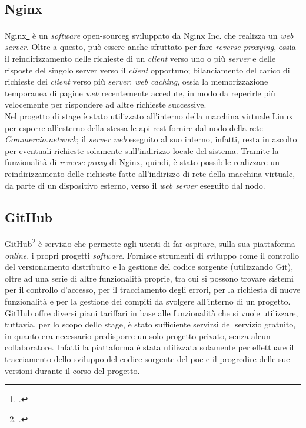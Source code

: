 \subsection{Nginx}

Nginx\footcite{site:nginx} è un \textit{software} \gls{open-sourceg} sviluppato da Nginx Inc. che realizza un \textit{web server}. Oltre a questo, può essere anche sfruttato per fare \textit{reverse proxying}, ossia il reindirizzamento delle richieste di un \textit{client} verso uno o più \textit{server} e delle risposte del singolo server verso il \textit{client} opportuno; bilanciamento del carico di richieste dei \textit{client} verso più \textit{server}; \textit{web caching}, ossia la memorizzazione temporanea di pagine \textit{web} recentemente accedute, in modo da reperirle più velocemente per rispondere ad altre richieste successive.\\
Nel progetto di stage è stato utilizzato all'interno della macchina virtuale Linux per esporre all'esterno della stessa le \gls{api} \gls{rest} fornire dal nodo della rete \textit{Commercio.network}; il \textit{server web} eseguito al suo interno, infatti, resta in ascolto per eventuali richieste solamente sull'indirizzo locale del sistema. Tramite la funzionalità di \textit{reverse proxy} di Nginx, quindi, è stato possibile realizzare un reindirizzamento delle richieste fatte all'indirizzo di rete della macchina virtuale, da parte di un dispositivo esterno, verso il \textit{web server} eseguito dal nodo.

\subsection{GitHub}

GitHub\footcite{site:github} è servizio che permette agli utenti di far ospitare, sulla sua piattaforma \textit{online}, i propri progetti \textit{software}. Fornisce strumenti di sviluppo come il controllo del versionamento distribuito e la gestione del codice sorgente (utilizzando Git), oltre ad una serie di altre funzionalità proprie, tra cui si possono trovare sistemi per il controllo d'accesso, per il tracciamento degli errori, per la richiesta di nuove funzionalità e per la gestione dei compiti da svolgere all'interno di un progetto.\\
GitHub offre diversi piani tariffari in base alle funzionalità che si vuole utilizzare, tuttavia, per lo scopo dello stage, è stato sufficiente servirsi del servizio gratuito, in quanto era necessario predisporre un solo progetto privato, senza alcun collaboratore. Infatti la piattaforma è stata utilizzata solamente per effettuare il tracciamento dello sviluppo del codice sorgente del \gls{poc} e il progredire delle sue versioni durante il corso del progetto.

